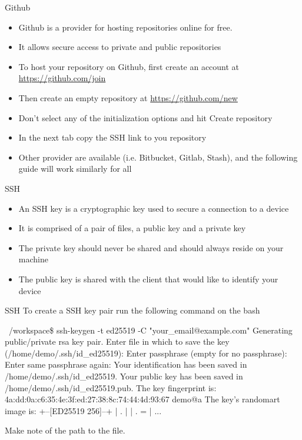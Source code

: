 \begin{frame}[fragile]{Github}
    \begin{itemize}[<+->] 
        \item Github is a provider for hosting repositories online for free.
        \item It allows secure access to private and public repositories
        \item To host your repository on Github, first create an account at \url{https://github.com/join}
        \item Then create an empty repository at \url{https://github.com/new}
        \item Don't select any of the initialization options and hit \alert{Create repository}
        \item In the next tab copy the \alert{SSH} link to you repository
        \item Other provider are available (i.e. Bitbucket, Gitlab, Stash), and the following guide will work similarly for all
    \end{itemize}
\end{frame}

\begin{frame}[fragile]{SSH}
\begin{itemize}[<+->] 
    \item An SSH key is a cryptographic key used to secure a connection to a device
    \item It is comprised of a pair of files, a public key and a private key
    \item The private key should never be shared and should always reside on your machine
    \item The public key is shared with the client that would like to identify your device
\end{itemize}
\end{frame}

\begin{frame}[fragile]{SSH\insertcontinuationtext}
    To create a SSH key pair run the following command on the bash
    \begin{shellblock}
~/workspace\$ ssh-keygen -t ed25519 -C "your_email@example.com"
Generating public/private rsa key pair.
Enter file in which to save the key (/home/demo/.ssh/id_ed25519): 
Enter passphrase (empty for no passphrase): 
Enter same passphrase again: 
Your identification has been saved in /home/demo/.ssh/id_ed25519.
Your public key has been saved in /home/demo/.ssh/id_ed25519.pub.
The key fingerprint is:
4a:dd:0a:c6:35:4e:3f:ed:27:38:8c:74:44:4d:93:67 demo@a
The key's randomart image is:
+--[ED25519 256]--+
|        .        |
|       . =       |
...
    \end{shellblock}
Make note of the path to the  file.
\end{frame}

